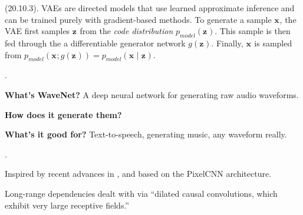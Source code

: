 \documentclass[11pt]{article}
\renewcommand\vec[2][]{\bm{#2}_{#1}}
\newcommand\myspace[1][]{\vspace{#1\bigskipamount}}
\newcommand\p{\Needspace{10\baselineskip} \noindent}
\begin{document}
\myspace 
\p {} (20.10.3). VAEs are directed models that use learned approximate inference and can be trained purely with gradient-based methods. To generate a sample $\vec x$, the VAE first samples $\vec z$ from the \textit{code distribution} $p_{model}(\vec z)$. This sample is then fed through the a differentiable generator network $g(\vec z)$. Finally, $\vec x$ is sampled from $p_{model}(\vec x; g(\vec z)) = p_{model}(\vec x \mid \vec z)$.  























\label{Papers and Tutorials}






\p {}. 
\begin{compactitem}
	\item \textbf{What's WaveNet?} A deep neural network for generating raw audio waveforms.
	\item \textbf{How does it generate them?} 
	\item \textbf{What's it good for?} Text-to-speech, generating music, any waveform really.
\end{compactitem}

\myspace
\p {}. 
\begin{compactitem}
	\item Inspired by recent advances in , and based on the PixelCNN architecture.  
	
	\item Long-range dependencies dealt with via ``dilated causal convolutions, which exhibit very large receptive fields.''
\end{compactitem}
\end{document}

